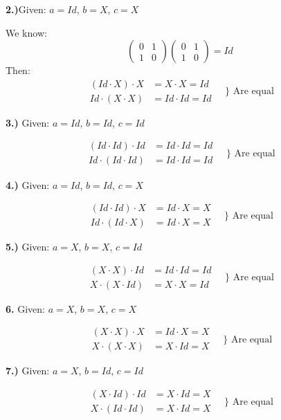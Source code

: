 \documentclass{article}
\begin{document}
\textbf{2.)}Given: \( a = Id \), \( b = X \), \( c = X \)

We know:
\[
\begin{pmatrix} 
0 & 1 \\
1 & 0 
\end{pmatrix}
\begin{pmatrix} 
0 & 1 \\
1 & 0 
\end{pmatrix}
= Id
\]
Then:
\[
\begin{aligned}
(Id \cdot X) \cdot X &= X \cdot X = Id \\
Id \cdot (X \cdot X) &= Id \cdot Id = Id
\end{aligned}
\quad \} \text{ Are equal}
\]

\textbf{3.)}
Given: \( a = Id \), \( b = Id \), \( c = Id \)

\[
\begin{aligned}
(Id \cdot Id) \cdot Id &= Id \cdot Id = Id \\
Id \cdot (Id \cdot Id) &= Id \cdot Id = Id
\end{aligned}
\quad \} \text{ Are equal}
\]

\textbf{4.)}
Given: \( a = Id \), \( b = Id \), \( c = X \)

\[
\begin{aligned}
(Id \cdot Id) \cdot X &= Id \cdot X = X \\
Id \cdot (Id \cdot X) &= Id \cdot X = X
\end{aligned}
\quad \} \text{ Are equal}
\]

\textbf{5.)}
Given: \( a = X \), \( b = X \), \( c = Id \)

\[
\begin{aligned}
(X \cdot X) \cdot Id &= Id \cdot Id = Id \\
X \cdot (X \cdot Id) &= X \cdot X = Id
\end{aligned}
\quad \} \text{ Are equal}
\]

\textbf{6.}
Given: \( a = X \), \( b = X \), \( c = X \)

\[
\begin{aligned}
(X \cdot X) \cdot X &= Id \cdot X = X \\
X \cdot (X \cdot X) &= X \cdot Id = X
\end{aligned}
\quad \} \text{ Are equal}
\]

\textbf{7.)}
Given: \( a = X \), \( b = Id \), \( c = Id \)

\[
\begin{aligned}
(X \cdot Id) \cdot Id &= X \cdot Id = X \\
X \cdot (Id \cdot Id) &= X \cdot Id = X
\end{aligned}
\quad \} \text{ Are equal}
\]
\end{document}
